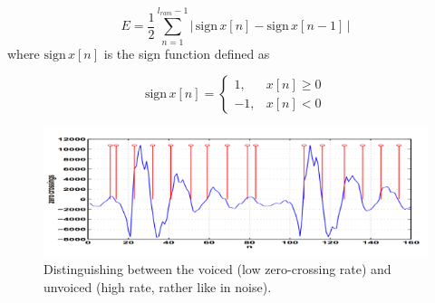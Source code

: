 \documentclass[12pt, a4paper, twoside]{report}
\begin{document}
\begin{equation*}
E = \frac{1}{2} \sum_{n=1}^{l_{ram} - 1} \left | \, \text{sign} \, x[n] - \text{sign} \, x[n-1] \, \right |
\end{equation*}
where $\text{sign} \, x[n]$ is the sign function defined as

\begin{equation*}
\text{sign} \, x[n] = \begin{cases}
1, & x[n] \geq 0 \\ 
-1, & x[n] < 0
\end{cases}
\end{equation*}

\begin{figure}[ht]
	\centering
	\includegraphics[width=1\textwidth]
	{images/chapter2/low-high-zcr}
	\caption{Distinguishing between the voiced (low zero-crossing rate) and unvoiced (high rate, rather like in noise).}
	\label{fig:low-high-zcr}
\end{figure}
\end{document}
